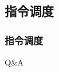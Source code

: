\documentclass{beamer}
\begin{document}
\subsection{指令调度}
\begin{frame}
	\frametitle{指令调度}
\end{frame}
\begin{frame}
	\begin{center}
	\Large{Q\&A}
	\end{center}
\end{frame}
\end{document}
